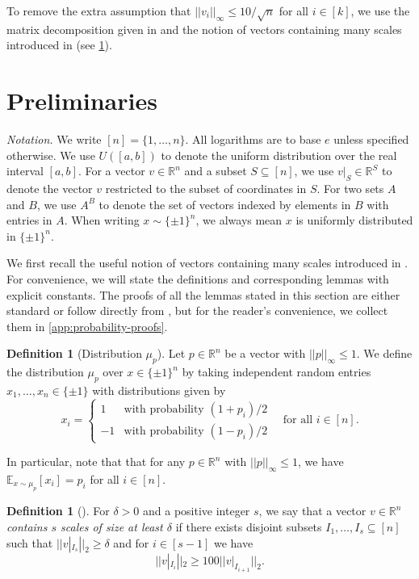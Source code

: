 \documentclass[reqno]{amsart}
\theoremstyle{remark}
\theoremstyle{definition}
\newtheorem{definition}[theorem]{Definition}
\numberwithin{theorem}{section}
\renewcommand{\(}{\bigl(}
\renewcommand{\)}{\bigr)\vphantom{)}}
\newcommand{\E}{\mathbb{E}}
\renewcommand{\le}{\leqslant}
\renewcommand{\ge}{\geqslant}
\newcommand{\R}{\mathbb R}
\newcommand{\bin}{\{\pm 1\}}
\begin{document}
To remove the extra assumption that $||v_i||_\infty\le 10/\sqrt{n}$ for all $i\in [k]$, we use the matrix decomposition given in \cite{yehuda2021slicing} and the notion of vectors containing many scales introduced in \cite{yehuda2021slicing} (see \cref{sec:prelim}).



\section{Preliminaries}\label{sec:prelim}

\noindent \emph{Notation.} We write $[n] = \{1,\dots, n\}$. All logarithms are to base $e$ unless specified otherwise. We use $U([a,b])$ to denote the uniform distribution over the real interval $[a,b]$. For a vector $v\in \R^n$ and a subset $S\subseteq [n]$, we use $v|_S\in \R^S$ to denote the vector $v$ restricted to the subset of coordinates in $S$. For two sets $A$ and $B$, we use $A^B$ to denote the set of vectors indexed by elements in $B$ with entries in $A$. When writing $x\sim \bin^n$, we always mean $x$ is uniformly distributed in $\bin^n$.

\medskip

We first recall the useful notion of vectors containing many scales introduced in \cite{yehuda2021slicing}. For convenience, we will state the definitions and corresponding lemmas with explicit constants. The proofs of all the lemmas stated in this section are either standard or follow directly from \cite{yehuda2021slicing}, but for the reader's convenience, we collect them in \cref{app:probability-proofs}.


\begin{definition}[Distribution $\mu_p$]
    Let $p\in \R^n$ be a vector with $||p||_\infty\le 1$. We define the distribution $\mu_p$ over $x\in \bin^n$ by taking independent random entries $x_1,\dots, x_n\in \bin$ with distributions given by 
    \[x_i = \begin{cases} 1 & \text{with probability } (1+p_i)/2 \\ -1 & \text{with probability } (1-p_i)/2 \end{cases} \quad \text{for all } i\in [n].\]
\end{definition}

In particular, note that that for any $p\in \R^n$ with $||p||_\infty\le 1$, we have $\E_{x\sim \mu_p}[x_i] = p_i$ for all $i\in [n]$.


\begin{definition}[\cite{yehuda2021slicing}]\label{def:scales}
    For $\delta>0$ and a positive integer $s$, we say that a vector $v\in \R^n$ \emph{contains $s$ scales of size at least $\delta$} if there exists disjoint subsets $I_1,\dots, I_s\subseteq [n]$ such that $||v|_{I_s}||_2 \ge \delta$ and for $i\in [s-1]$ we have
    \[||v|_{I_i}||_2 \ge 100||v|_{I_{i+1}}||_2.\]
\end{definition}
\end{document}
